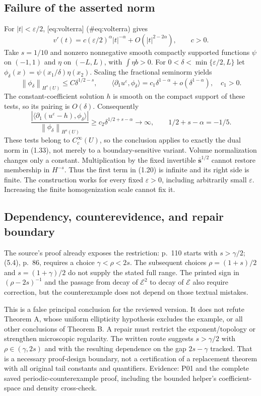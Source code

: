 \documentclass[10pt]{article}
\begin{document}
\subsection*{Failure of the asserted norm}
For \(|t|<\varepsilon/2\), [eq:volterra] (\#eq:volterra) gives \[v'(t)=c(\varepsilon/2)^\alpha |t|^{-\alpha}
       +O(|t|^{2-2\alpha}),\qquad c>0.\] Take \(s=1/10\) and nonzero nonnegative smooth compactly supported functions \(\psi\) on \((-1,1)\) and \(\eta\) on \((-L,L)\), with \(\int\eta b>0\). For \(0<\delta<\min\{\varepsilon/2,L\}\) let \(\phi_\delta(x)=\psi(x_1/\delta)\eta(x_2)\). Scaling the fractional seminorm yields \[\left\lVert\phi_\delta\right\rVert_{H^s(U)}\le C\delta^{1/2-s},\qquad
 \langle\partial_1u^\varepsilon,\phi_\delta\rangle
   =c_1\delta^{1-\alpha}+o(\delta^{1-\alpha}),\quad c_1>0.\] The constant-coefficient solution \(h\) is smooth on the compact support of these tests, so its pairing is \(O(\delta)\). Consequently \[\frac{|\langle\partial_1(u^\varepsilon-h),\phi_\delta\rangle|}
      {\left\lVert\phi_\delta\right\rVert_{H^s(U)}}
 \ge c_2\delta^{1/2+s-\alpha}\longrightarrow\infty,
 \qquad 1/2+s-\alpha=-1/5.\] These tests belong to \(C_c^\infty(U)\), so the conclusion applies to exactly the dual norm in (1.33), not merely to a boundary-sensitive variant. Volume normalization changes only a constant. Multiplication by the fixed invertible \(\overline{\mathbf s}^{1/2}\) cannot restore membership in \(H^{-s}\). Thus the first term in (1.20) is infinite and its right side is finite. The construction works for every fixed \(\varepsilon>0\), including arbitrarily small \(\varepsilon\). Increasing the finite homogenization scale cannot fix it.\par
\subsection*{Dependency, counterevidence, and repair boundary}
The source’s proof already exposes the restriction: p. 110 starts with \(s>\gamma/2\); (5.4), p. 86, requires a choice \(\gamma<\rho<2s\). The subsequent choices \(\rho=(1+s)/2\) and \(s=(1+\gamma)/2\) do not supply the stated full range. The printed sign in \((\rho-2s)^{-1}\) and the passage from decay of \(\mathcal E^2\) to decay of \(\mathcal E\) also require correction, but the counterexample does not depend on those textual mistakes.\par
This is a false principal conclusion for the reviewed version. It does not refute Theorem A, whose uniform ellipticity hypothesis excludes the example, or all other conclusions of Theorem B. A repair must restrict the exponent/topology or strengthen microscopic regularity. The written route suggests \(s>\gamma/2\) with \(\rho\in(\gamma,2s)\) and with the resulting dependence on the gap \(2s-\gamma\) tracked. That is a necessary proof-design boundary, not a certification of a replacement theorem with all original tail constants and quantifiers. Evidence: P01 and the complete saved periodic-counterexample proof, including the bounded helper’s coefficient-space and density cross-check.\par
\end{document}

